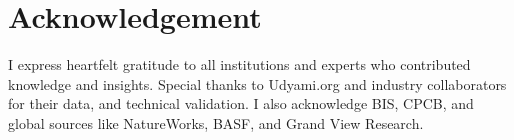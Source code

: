 \section*{Acknowledgement}
I express heartfelt gratitude to all institutions and experts who contributed knowledge and insights. Special thanks to Udyami.org and industry collaborators for their data, and technical validation. I also acknowledge BIS, CPCB, and global sources like NatureWorks, BASF, and Grand View Research.
